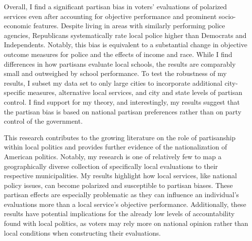 Overall, I find a significant partisan bias in voters' evaluations of polarized services even after accounting for objective performance and prominent socio-economic features. Despite living in areas with similarly performing police agencies, Republicans systematically rate local police higher than Democrats and Independents. Notably, this bias is equivalent to a substantial change in objective outcome measures for police and the effects of income and race. While I find differences in how partisans evaluate local schools, the results are comparably small and outweighed by school performance. To test the robustness of my results, I subset my data set to only large cities to incorporate additional city-specific measures, alternative local services, and city and state levels of partisan control. I find support for my theory, and interestingly, my results suggest that the partisan bias is based on national partisan preferences rather than on party control of the government.

This research contributes to the growing literature on the role of partisanship within local politics and provides further evidence of the nationalization of American politics. Notably, my research is one of relatively few to map a geographically diverse collection of specifically local evaluations to their respective municipalities. My results highlight how local services, like national policy issues, can become polarized and susceptible to partisan biases. These partisan effects are especially problematic as they can influence an individual's evaluations more than a local service's objective performance. Additionally, these results have potential implications for the already low levels of accountability found with local politics, as voters may rely more on national opinion rather than local conditions when constructing their evaluations.



